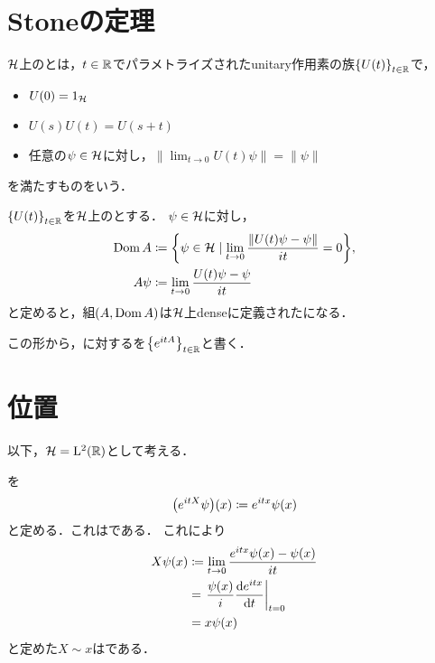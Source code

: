 \begin{abstract}
		量子力学では，\sa が物理量に対応している．
		また，運動量やHamiltonianといった物理量は
		空間並進や時間発展などの操作を与えるunitary作用素を与える．
		物理では，作用素の定義域を気にすることは少ないが，
		数学的には定義域が重要で，``定義できるところで定義する''ことが大切になる．
		定義域を直接議論することはむずかしいが，Stoneの定理により\onepara から定義域を含めた\sa を構成することができる\cite{Hall2013}．

		なお，本稿の内容はspm22ndの特別講演で教わった．
\end{abstract}
\section{Stoneの定理}
\begin{defn}[\onepara]
		$\mathcal{H}$上の\onepara とは，$t\in\mathbb{R}$でパラメトライズされたunitary作用素の族$\qty{U(t)}_{t\in\mathbb{R}}$で，
		\begin{itemize}
				\item $U(0) = 1_{\mathcal{H}}$
				\item $U(s)U(t) = U(s+t) $
				\item 任意の$\psi\in\mathcal{H}$に対し，$\|\lim_{t\to0}U(t)\psi\|=\|\psi\| $
		\end{itemize}
		を満たすものをいう．
\end{defn}
\begin{thm}
	$\qty{U(t)}_{t\in\mathbb{R}}$を$\mathcal{H}$上の\onepara とする．
	$\psi\in\mathcal{H}$に対し，
	\begin{align}
			\operatorname{Dom} A &\coloneqq \qty{\psi\in\mathcal{H}\mid \lim_{t\to0}\frac{\|U(t)\psi - \psi \|}{it} = 0}, \\
			A\psi &\coloneqq \lim_{t\to0}\frac{U(t)\psi - \psi}{it}
	\end{align}
	と定めると，組$(A, \operatorname{Dom} A)$は$\mathcal{H}$上denseに定義された\sa になる．

	この形から，\sa に対する\onepara を$\qty{e^{itA}}_{t\in\mathbb{R}}$と書く．
\end{thm}

\section{位置}
以下，$\mathcal{H} =\mathrm{L^2}(\mathbb{R})$として考える．

\onepara を
\begin{align}
		\qty(e^{itX}\psi)(x) \coloneqq e^{itx}\psi(x)
\end{align}
と定める．これは\onepara である．
これにより
\begin{align}
		X\psi(x) &\coloneqq \lim_{t\to0}\frac{e^{itx}\psi(x) - \psi(x)}{it}\\
		  &= \left.\frac{\psi(x)}{i}\dv{e^{itx}}{t}\right|_{t=0}\\
		  &= x\psi(x)
\end{align}
と定めた$X\sim x$は\sa である．

